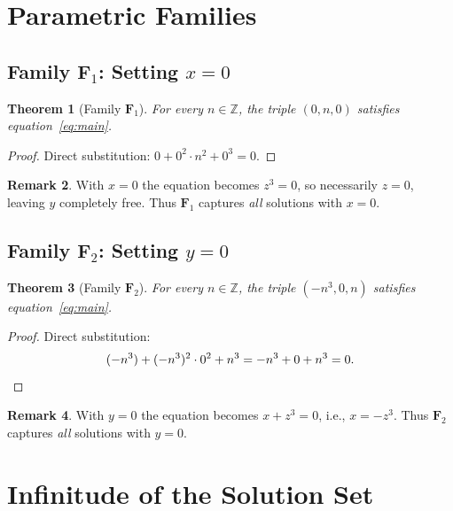 \documentclass[12pt,a4paper]{article}
\newtheorem{theorem}{Theorem}[section]
\theoremstyle{definition}
\newtheorem{remark}[theorem]{Remark}
\newcommand{\Z}{\mathbb{Z}}
\begin{document}
\section{Parametric Families}

\subsection{Family \texorpdfstring{$\mathbf{F}_1$}{F1}: Setting \texorpdfstring{$x = 0$}{x=0}}

\begin{theorem}[Family $\mathbf{F}_1$]\label{thm:family1}
  For every $n \in \Z$, the triple $(0, n, 0)$ satisfies equation~\eqref{eq:main}.
\end{theorem}

\begin{proof}
  Direct substitution: $0 + 0^2 \cdot n^2 + 0^3 = 0$.
\end{proof}

\begin{remark}
  With $x = 0$ the equation becomes $z^3 = 0$, so necessarily $z = 0$, leaving $y$
  completely free.  Thus $\mathbf{F}_1$ captures \emph{all} solutions with $x = 0$.
\end{remark}

\subsection{Family \texorpdfstring{$\mathbf{F}_2$}{F2}: Setting \texorpdfstring{$y = 0$}{y=0}}

\begin{theorem}[Family $\mathbf{F}_2$]\label{thm:family2}
  For every $n \in \Z$, the triple $(-n^3, 0, n)$ satisfies equation~\eqref{eq:main}.
\end{theorem}

\begin{proof}
  Direct substitution:
  \[
    (-n^3) + (-n^3)^2 \cdot 0^2 + n^3 = -n^3 + 0 + n^3 = 0. \qedhere
  \]
\end{proof}

\begin{remark}
  With $y = 0$ the equation becomes $x + z^3 = 0$, i.e., $x = -z^3$.  Thus $\mathbf{F}_2$
  captures \emph{all} solutions with $y = 0$.
\end{remark}

\section{Infinitude of the Solution Set}
\end{document}
